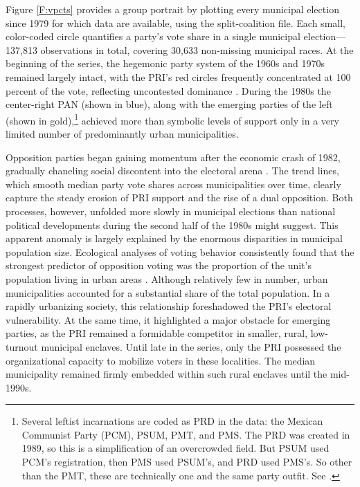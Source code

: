 \documentclass[letter,12pt]{article}
\begin{document}
Figure \ref{F:vpcts} provides a group portrait by plotting every municipal election since 1979 for which data are available, using the split-coalition file. Each small, color-coded circle quantifies a party's vote share in a single municipal election---137,813 observations in total, covering 30,633 non-missing municipal races. At the beginning of the series, the hegemonic party system of the 1960s and 1970s remained largely intact, with the PRI's red circles frequently concentrated at 100 percent of the vote, reflecting uncontested dominance \citep{segovia.els1979}. During the 1980s the center-right PAN (shown in blue), along with the emerging parties of the left (shown in gold),\footnote{Several leftist incarnations are coded as PRD in the data: the Mexican Communist Party (PCM), PSUM, PMT, and PMS. The PRD was created in 1989, so this is a simplification of an overcrowded field. But PSUM used PCM's registration, then PMS used PSUM's, and PRD used PMS's. So other than the PMT, these are technically one and the same party outfit. See \citet{molinar.1991a}.} achieved more than symbolic levels of support only in a very limited number of predominantly urban municipalities.

Opposition parties began gaining momentum after the economic crash of 1982, gradually chaneling social discontent into the electoral arena \citep{molinar.1991a, klesner.Alignment.1993, hiskey.canache.2005, gomezTagle.Estadisticas1990, segovia.dientes-sierra1983}. The trend lines, which smooth median party vote shares across municipalities over time, clearly capture the steady erosion of PRI support and the rise of a dual opposition. Both processes, however, unfolded more slowly in municipal elections than national political developments during the second half of the 1980s might suggest. This apparent anomaly is largely explained by the enormous disparities in municipal population size. Ecological analyses of voting behavior consistently found that the strongest predictor of opposition voting was the proportion of the unit's population living in urban areas \citep{ames.1970, lehr.1985, magar.1994, walton.sween-1973, pacheco.VotoUrb.1997}. Although relatively few in number, urban municipalities accounted for a substantial share of the total population. In a rapidly urbanizing society, this relationship foreshadowed the PRI's electoral vulnerability. At the same time, it highlighted a major obstacle for emerging parties, as the PRI remained a formidable competitor in smaller, rural, low-turnout municipal enclaves. Until late in the series, only the PRI possessed the organizational capacity to mobilize voters in these localities. The median municipality remained firmly embedded within such rural enclaves until the mid-1990s.
\end{document}
